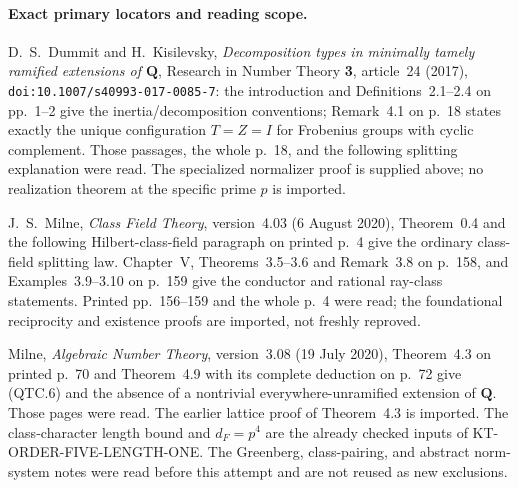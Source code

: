 \paragraph{Exact primary locators and reading scope.}
D.~S.~Dummit and H.~Kisilevsky,
\emph{Decomposition types in minimally tamely ramified extensions
of $\mathbf Q$}, Research in Number Theory \textbf{3}, article~24
(2017), \texttt{doi:10.1007/s40993-017-0085-7}:
the introduction and Definitions~2.1--2.4 on pp.~1--2 give the
inertia/decomposition conventions; Remark~4.1 on p.~18 states
exactly the unique configuration $T=Z=I$ for Frobenius groups with
cyclic complement.  Those passages, the whole p.~18, and the
following splitting explanation were read.  The specialized
normalizer proof is supplied above; no realization theorem at the
specific prime $p$ is imported.

J.~S.~Milne, \emph{Class Field Theory}, version~4.03
(6 August 2020), Theorem~0.4 and the following Hilbert-class-field
paragraph on printed p.~4 give the ordinary class-field splitting
law.  Chapter~V, Theorems~3.5--3.6 and Remark~3.8 on p.~158,
and Examples~3.9--3.10 on p.~159 give the conductor and rational
ray-class statements.  Printed pp.~156--159 and the whole p.~4
were read; the foundational reciprocity and existence proofs are
imported, not freshly reproved.

Milne, \emph{Algebraic Number Theory}, version~3.08
(19 July 2020), Theorem~4.3 on printed p.~70 and Theorem~4.9
with its complete deduction on p.~72 give (QTC.6) and the absence
of a nontrivial everywhere-unramified extension of $\mathbf Q$.
Those pages were read.  The earlier lattice proof of Theorem~4.3
is imported.  The class-character length bound and $d_F=p^4$
are the already checked inputs of KT-ORDER-FIVE-LENGTH-ONE.
The Greenberg, class-pairing, and abstract norm-system notes were
read before this attempt and are not reused as new exclusions.
